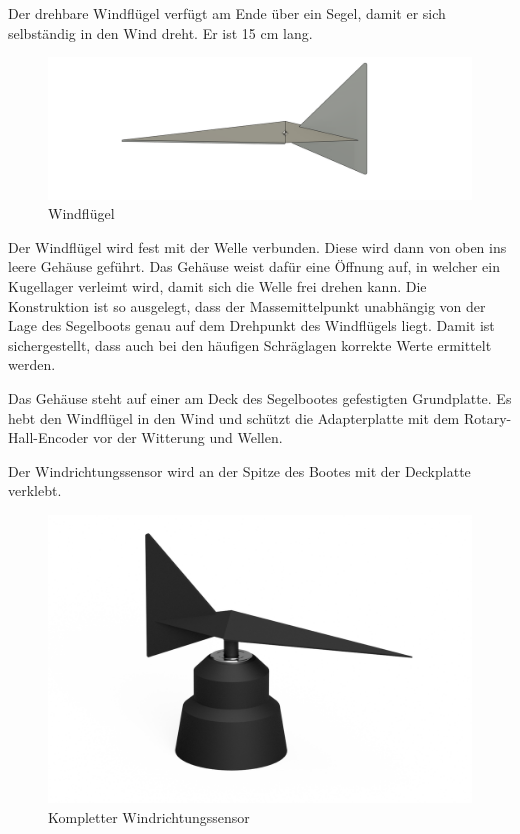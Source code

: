 Der drehbare Windflügel verfügt am Ende über ein Segel, damit er sich selbständig in den Wind dreht. Er ist 15 cm lang.
\begin{figure}[H]
    \centering
    \includegraphics[width=0.75\linewidth]{assets/windsensor_top.png}
    \caption{Windflügel}
    
\end{figure}

Der Windflügel wird fest mit der Welle verbunden. Diese wird dann von oben ins leere Gehäuse geführt. Das Gehäuse weist dafür eine Öffnung auf, in welcher ein Kugellager verleimt wird, damit sich die Welle frei drehen kann. Die Konstruktion ist so ausgelegt, dass der Massemittelpunkt unabhängig von der Lage des Segelboots genau auf dem Drehpunkt des Windflügels liegt. Damit ist sichergestellt, dass auch bei den häufigen Schräglagen korrekte Werte ermittelt werden.

Das Gehäuse steht auf einer am Deck des Segelbootes gefestigten Grundplatte. Es hebt den Windflügel in den Wind und schützt die Adapterplatte mit dem Rotary-Hall-Encoder vor der Witterung und Wellen.


Der Windrichtungssensor wird an der Spitze des Bootes mit der Deckplatte verklebt.
\begin{figure}[H]
    \centering
    \includegraphics[width=0.75\linewidth]{assets/full_wind_sensor.png}
    \caption{Kompletter Windrichtungssensor}
    \label{fig:enter-label}
\end{figure}

